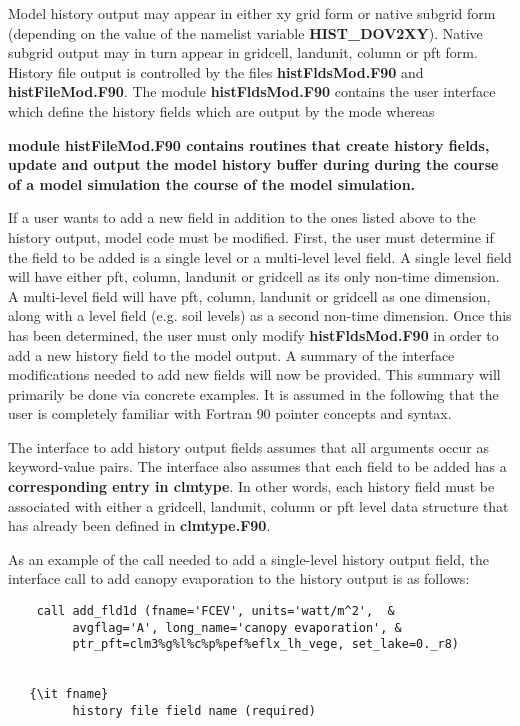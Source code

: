 Model history output may appear in either xy grid form or native
subgrid form (depending on the value of the namelist variable {\bf
HIST\_DOV2XY}).  Native subgrid output may in turn appear in gridcell,
landunit, column or pft form.  History file output is controlled by
the files {\bf histFldsMod.F90} and {\bf histFileMod.F90}. The module
{\bf histFldsMod.F90} contains the user interface which define the
history fields which are output by the mode whereas {\bf module {\bf
histFileMod.F90} contains routines that create history fields, update
and output the model history buffer during during the course of a
model simulation the course of the model simulation.

If a user wants to add a new field in addition to the ones listed
above to the history output, model code must be modified. First, the
user must determine if the field to be added is a single level or a
multi-level level field.  A single level field will have either pft,
column, landunit or gridcell as its only non-time dimension. A
multi-level field will have pft, column, landunit or gridcell as one
dimension, along with a level field (e.g. soil levels) as a second
non-time dimension. Once this has been determined, the user must only
modify {\bf histFldsMod.F90} in order to add a new history field to
the model output.  A summary of the interface modifications needed to
add new fields will now be provided.  This summary will primarily be
done via concrete examples. 
It is assumed in the following
that the user is completely familiar with Fortran 90 pointer concepts
and syntax.

The interface to add history output fields assumes that all arguments
occur as keyword-value pairs.  The interface also assumes that each
field to be added has a {\bf corresponding entry in clmtype}.  In
other words, each history field must be associated with either a
gridcell, landunit, column or pft level data structure that has
already been defined in {\bf clmtype.F90}.

As an example of the call needed to add a single-level history output
field, the interface call to add canopy evaporation to the history
output is as follows:

\begin{verbatim}
    call add_fld1d (fname='FCEV', units='watt/m^2',  &
         avgflag='A', long_name='canopy evaporation', &
         ptr_pft=clm3%g%l%c%p%pef%eflx_lh_vege, set_lake=0._r8)


   {\it fname}     
         history file field name (required)


\end{verbatim}}
